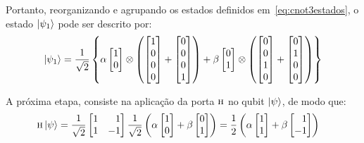 Portanto, reorganizando e agrupando os estados definidos em~\eqref{eq:cnot3estados}, o estado $\ket{\psi_1}$ pode ser descrito por:
\begin{equation}\label{eq:psi1}
\ket{\psi_1} = \frac{1}{\sqrt{2}} \left\{  \alpha \begin{bmatrix}
1 \\
0
\end{bmatrix} \otimes \left( \begin{bmatrix}
1 \\
0 \\
0 \\
0
\end{bmatrix} + \begin{bmatrix}
0 \\
0 \\
0 \\
1
\end{bmatrix}\right) + \beta \begin{bmatrix}
0 \\
1
\end{bmatrix} \otimes \left( \begin{bmatrix}
0 \\
0 \\
1 \\
0
\end{bmatrix} + \begin{bmatrix}
0 \\
1 \\
0 \\
0
\end{bmatrix}\right) \right\}
\end{equation}

A próxima etapa, consiste na aplicação da porta \(\operatorname{\textsc{h}}\) no qubit $\ket{\psi}$, de modo que:
\begin{equation}\label{eq:halfabeta}
  	\begin{split}
		\HAD \ket{\psi} &= \frac{1}{\sqrt{2}} \begin{bmatrix*}[r]
		1 & 1 \\
		1 & -1
		\end{bmatrix*} \frac{1}{\sqrt{2}}\left(\alpha \begin{bmatrix}
		1 \\
		0 
		\end{bmatrix} + \beta \begin{bmatrix}
		0 \\
		1
		\end{bmatrix} \right) = \frac{1}{2} \left(\alpha \begin{bmatrix}
		1 \\
		1 
		\end{bmatrix} + \beta \begin{bmatrix*}[r]
		1 \\
		-1
		\end{bmatrix*} \right)
  	\end{split}
\end{equation}

